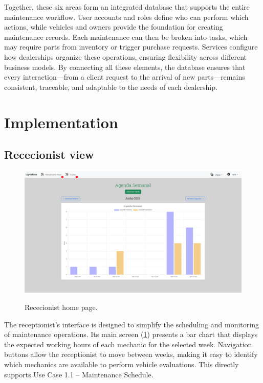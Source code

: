 Together, these six areas form an integrated database that supports the entire maintenance workflow. User accounts and roles define who can perform which actions, while vehicles and owners provide the foundation for creating maintenance records. Each maintenance can then be broken into tasks, which may require parts from inventory or trigger purchase requests. Services configure how dealerships organize these operations, ensuring flexibility across different business models. By connecting all these elements, the database ensures that every interaction—from a client request to the arrival of new parts—remains consistent, traceable, and adaptable to the needs of each dealership.


\section{Implementation}

\subsection{Rececionist view}



\begin{figure}[h]
  \caption{Rececionist home page.}
  \centering
  \includegraphics[width=\textwidth]{figs/Implementation/rececionist/rececionistHomePage}
  \label{fig:impReceHome}
\end{figure}

The receptionist's interface is designed to simplify the scheduling and monitoring of maintenance operations. Its main screen (\ref{fig:impReceHome}) presents a bar chart that displays the expected working hours of each mechanic for the selected week. Navigation buttons allow the receptionist to move between weeks, making it easy to identify which mechanics are available to perform vehicle evaluations. This directly supports Use Case 1.1 – Maintenance Schedule.


